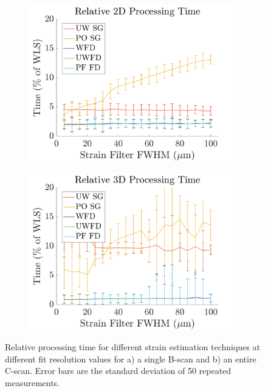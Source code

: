 \begin{figure}[t!]
	\centering
    \begin{subfigure}{0.49\textwidth}
    	\centering
        \includegraphics[width=\textwidth]{figures/2d_relative_fr.png}
    \end{subfigure}
    \begin{subfigure}{0.49\textwidth}
    	\centering
        \includegraphics[width=\textwidth]{figures/3d_relative_fr.png}
    \end{subfigure}
    \caption{Relative processing time for different strain estimation techniques at different fit resolution values for a) a single B-scan and b) an entire C-scan. Error bars are the standard deviation of 50 repeated measurements.}
    \label{process_time_1}
\end{figure}

